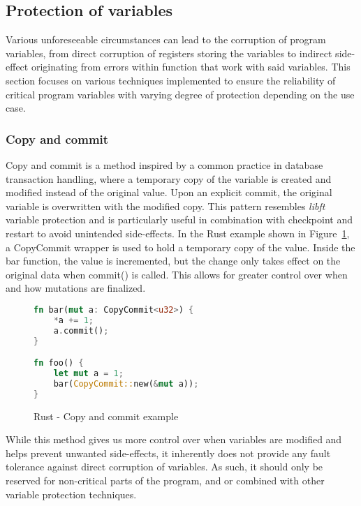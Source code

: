\subsection{Protection of variables} \label{sec:var_protection}

Various unforeseeable circumstances can lead to the corruption of program variables, from direct corruption of registers storing the variables to indirect side-effect originating from errors within function that work with said variables. This section focuses on various techniques implemented to ensure the reliability of critical program variables with varying degree of protection depending on the use case.

\subsubsection{Copy and commit}

Copy and commit is a method inspired by a common practice in database transaction handling, where a temporary copy of the variable is created and modified instead of the original value. Upon an explicit commit, the original variable is overwritten with the modified copy. This pattern resembles \textit{libft} \cite{libft} variable protection and is particularly useful in combination with checkpoint and restart to avoid unintended side-effects. In the Rust example shown in Figure~\ref{fig:rust_copy_commit}, a CopyCommit wrapper is used to hold a temporary copy of the value. Inside the bar function, the value is incremented, but the change only takes effect on the original data when commit() is called. This allows for greater control over when and how mutations are finalized.

\begin{figure}[!h]
\begin{lstlisting}[language=Rust]
fn bar(mut a: CopyCommit<u32>) {
    *a += 1;
    a.commit();
}

fn foo() {
    let mut a = 1;
    bar(CopyCommit::new(&mut a));
}
\end{lstlisting}
\caption{Rust - Copy and commit example}
\label{fig:rust_copy_commit}
\end{figure}

While this method gives us more control over when variables are modified and helps prevent unwanted side-effects, it inherently does not provide any fault tolerance against direct corruption of variables. As such, it should only be reserved for non-critical parts of the program, and or combined with other variable protection techniques.

